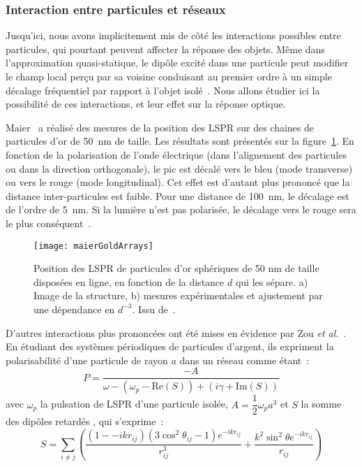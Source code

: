 		\subsubsection{Interaction entre particules et réseaux}
Jusqu'ici, nous avons implicitement mis de côté les interactions possibles entre particules, qui pourtant peuvent affecter la réponse des objets. Même dans l'approximation quasi-statique, le dipôle excité dans une particule peut modifier le champ local perçu par sa voisine conduisant au premier ordre à un simple décalage fréquentiel par rapport à l'objet isolé~\cite{yamaguchi74}. Nous allons étudier ici la possibilité de ces interactions, et leur effet sur la réponse optique.\par 
Maier~\cite{maier2007plasmonics} a réalisé des mesures de la position des LSPR sur des chaines de particules d'or de 50~nm de taille. Les résultats sont présentés sur la figure~\ref{maierGoldArrays}. En fonction de la polarisation de l'onde électrique (dans l'alignement des particules ou dans la direction orthogonale), le pic est décalé vers le bleu (mode transverse) ou vers le rouge (mode longitudinal). Cet effet est d'autant plus prononcé que la distance inter-particules est faible. Pour une distance de 100~nm, le décalage est de l'ordre de 5~nm. Si la lumière n'est pas polarisée, le décalage vers le rouge sera le plus conséquent~\cite{kinnan2010plasmon}.\par 
\begin{figure}[!htb]
	\centering
	\texttt{[image: maierGoldArrays]}
	\caption{Position des LSPR de particules d'or sphériques de 50 nm de taille disposées en ligne, en fonction de la distance $d$ qui les sépare. a) Image de la structure, b) mesures expérimentales et ajustement par une dépendance en $d^{-3}$. Issu de~\cite{maier2007plasmonics}.}
	\label{maierGoldArrays}
\end{figure}
D'autres interactions plus prononcées ont été mises en évidence par Zou \textit{et al.}~\cite{zou2004narrow}. En étudiant des systèmes périodiques de particules d'argent, ils expriment la polarisabilité d'une particule de rayon $a$ dans un réseau comme étant~:
\begin{equation}
P = \dfrac{-A}{\omega - (\omega_p - \mathrm{Re}(S))+(i\gamma+\mathrm{Im}(S))}
\end{equation}
avec $\omega_p$ la pulsation de LSPR d'une particule isolée, $A = \dfrac{1}{2}\omega_pa^3$ et $S$ la \og somme des dipôles
retardés \fg, qui s'exprime~:
\begin{equation}
S = \sum_{i\neq j}\left(\dfrac{(1--ikr_{ij})(3\cos^2\theta_{ij}-1)e^{-ikr_{ij}}}{r_{ij}^3} +\dfrac{k^2\sin^2\theta e^{-ikr_{ij}}}{r_{ij}}\right)
\end{equation}
